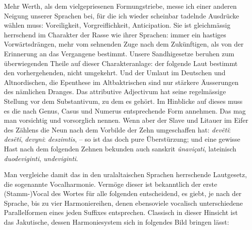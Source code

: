 Mehr Werth, als dem vielgepriesenen Formungstriebe, messe ich einer anderen Neigung unserer Sprachen bei, für die ich wieder scheinbar tadelnde Ausdrücke wählen muss: Voreiligkeit, Vorgreiflichkeit, Anticipation. Sie ist gleichmässig herrschend im Charakter der Rasse wie ihrer Sprachen: immer ein hastiges Vorwärtsdrängen, mehr vom sehnenden Zuge nach dem Zukünftigen, als von der Erinnerung an das Vergangene bestimmt. Unsere Sandhigesetze beruhen zum überwiegenden Theile auf dieser Charakteranlage: der folgende Laut bestimmt den vorhergehenden, nicht umgekehrt. Und der Umlaut im Deutschen und Altnordischen, die Epenthese im Altbaktrischen sind nur stärkere Äusse\label{fp.382}rungen des nämlichen Dranges. Das attributive Adjectivum hat seine regelmässige Stellung vor dem Substantivum, zu dem es gehört. Im Hinblicke auf dieses muss es die nach Genus, Casus und Numerus entsprechende Form annehmen. Das mag man vorsichtig und vorsorglich nennen. Wenn aber der Slave und Litauer im Eifer des Zählens die Neun nach dem Vorbilde der Zehn umgeschaffen hat: \textit{devẽtĭ}: \textit{desẽtĭ}, \textit{devyni}: \textit{deszimtis}, – so ist das doch pure Überstürzung; und eine gewisse Hast nach dem folgenden Zehnen bekunden auch sanskrit \textit{ûnaviçati}, lateinisch \textit{duodeviginti}, \textit{undeviginti}. 

Man vergleiche damit das in den uralaltaischen Sprachen herrschende Laut\-\label{sp.402}gesetz, die sogenannte Vocalharmonie. Vermöge dieser ist bekanntlich der erste (Stamm-)Vocal des Wortes für alle folgenden entscheidend, es giebt, je nach der Sprache, bis zu vier Harmoniereihen, denen ebensoviele vocalisch unterschiedene Parallelformen eines jeden Suffixes entsprechen. Classisch in dieser Hinsicht ist das Jakutische, dessen Harmoniesystem sich in folgendes Bild bringen lässt:

